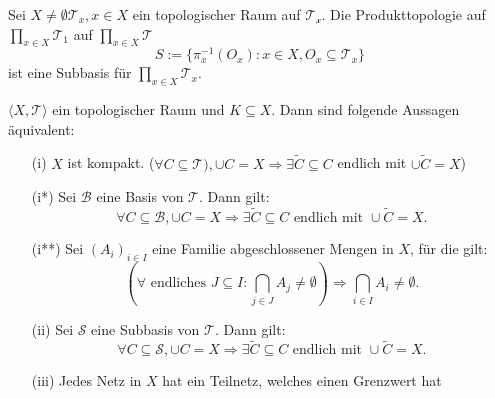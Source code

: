  \ex{}
 {
Sei $X \neq \emptyset \mathcal{T}_x, x \in X$  ein topologischer Raum 
 auf $\mathcal{T_x}$.
 Die Produkttopologie auf $ \prod_{x \in X} \mathcal{T}_1$ auf 
 $\prod_{x \in X} \mathcal{T}$
 $$
 S:= \{ \pi_x^{-1}(O_x) : x \in X, O_x \subseteq \mathcal{T}_x \}
 $$
    ist eine Subbasis für $\prod_{x \in X} \mathcal{T}_x$.
 }

\thm{}
{
    $\langle X, \mathcal{T} \rangle$ ein topologischer Raum und 
    $K \subseteq X$. Dann sind folgende Aussagen äquivalent:
    \begin{itemize}
        \item[(i)] $X$ ist kompakt. 
        ($\forall C \subseteq \mathcal{T}), 
        \cup C = X \Rightarrow \exists \tilde{C} 
        \subseteq C$ endlich mit $\cup \tilde{C} = X$)
        \item[(i*)] Sei $\mathcal{B}$ eine Basis von $\mathcal{T}$.
        Dann gilt:
        $$
        \forall C \subseteq \mathcal{B}, 
        \cup C = X \Rightarrow \exists \tilde{C} 
        \subseteq C \text{ endlich mit } \cup \tilde{C} = X .
        $$
        \item[(i**)] Sei $(A_i)_{i \in I}$ eine Familie abgeschlossener 
        Mengen in 
        $X$, für die gilt:
        $$
        (\forall \text{ endliches } J \subseteq I :
        \bigcap_{j \in J} A_j \neq \emptyset) \Rightarrow
        \bigcap_{i \in I} A_i \neq \emptyset .
        $$
        \item[(ii)] Sei $\mathcal{S}$ eine Subbasis von $\mathcal{T}$.
        Dann gilt:
        $$
        \forall C \subseteq \mathcal{S}, 
        \cup C = X \Rightarrow \exists \tilde{C} 
        \subseteq C \text{ endlich mit } \cup \tilde{C} = X .
        $$  
        \item[(iii)] Jedes Netz in $X$ hat ein Teilnetz,
         welches einen Grenzwert hat
    \end{itemize}
}

